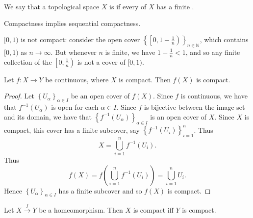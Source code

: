 \documentclass[notoc,notitlepage]{tufte-book}
\begin{document}
\begin{defn}[Compactness]\label{defn:compactness}
  We say that a topological space $X$ is  if every 
  of $X$ has a finite .
\end{defn}

\begin{lemma}\label{lemma:compactness_implies_sequential_compactness}
  Compactness implies sequential compactness.
\end{lemma}

\begin{eg}
  $[ 0, 1 )$ is not compact: consider the open cover
  $\left\{ \left[ 0, 1 - \frac{1}{n} \right) \right\}_{n \in \mathbb{N}}$, which contains
  $[0, 1)$ as $n \to \infty$. But whenever $n$ is finite, we have $1 - \frac{1}{n} < 1$,
  and so any finite collection of the $\left[0, \frac{1}{n}\right)$ is not a cover of
  $[0, 1)$.
\end{eg}

\begin{thm}\label{thm:continuous_maps_map_compact_sets_to_compact_images}
  Let $f : X \to Y$ be continuous, where $X$ is compact. Then $f(X)$ is compact.
\end{thm}

\begin{proof}
  Let $\left\{ U_\alpha \right\}_{\alpha \in I}$ be an open cover of $f(X)$. Since
  $f$ is continuous, we have that $f^{-1} \left( U_\alpha \right)$ is open for each
  $\alpha \in I$. Since $f$ is bijective between the image set and its domain, we
  have that $\left\{ f^{-1} \left( U_\alpha \right) \right\}_{\alpha \in I}$ is an
  open cover of $X$. Since $X$ is compact, this cover has a finite subcover, say
  $\left\{ f^{-1} \left( U_i \right) \right\}_{i = 1}^{n}$. Thus
  \begin{equation*}
    X = \bigcup_{i=1}^{n} f^{-1} \left( U_i \right).
  \end{equation*}
  Thus
  \begin{equation*}
    f(X) = f \left( \bigcup_{i=1}^{n} f^{-1} \left( U_i \right) \right) = \bigcup_{i=1}^{n} U_i.
  \end{equation*}
  Hence $\left\{ U_\alpha \right\}_{\alpha \in I}$ has a finite subcover and so
  $f(X)$ is compact.
\end{proof}

\begin{crly}\label{crly:homeomorphic_maps_map_compact_sets_to_compact_sets}
  Let $X \overset{f}{\to} Y$ be a homeomorphism. Then $X$ is compact iff
  $Y$ is compact.
\end{crly}
\end{document}
